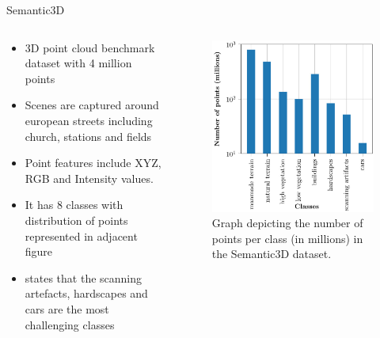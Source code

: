\documentclass[aspectratio=169]{beamer}
\begin{document}
\begin{frame}{Semantic3D}
    \begin{columns}
        \begin{column}{0.5\textwidth}
            \begin{itemize}
                \item 3D point cloud benchmark dataset with 4 million points
                \item Scenes are captured around european streets including church, stations and fields
                \item Point features include XYZ, RGB and Intensity values.
                \item It has 8 classes with distribution of points represented in adjacent figure
                \item \cite{hackel2017semantic3d} states that the scanning artefacts, hardscapes and cars are the most challenging classes
            \end{itemize}
        \end{column}
        \begin{column}{0.5\textwidth}
            \begin{figure}
                \centering
                \includegraphics[scale=0.22]{images/sem3d/sem3d_stats.jpg}
                \caption{Graph depicting the number of points per class (in millions) in the Semantic3D dataset.}
                \label{fig:sem3d_stats}
            \end{figure}
        \end{column}
    \end{columns}
\end{frame}
\end{document}
